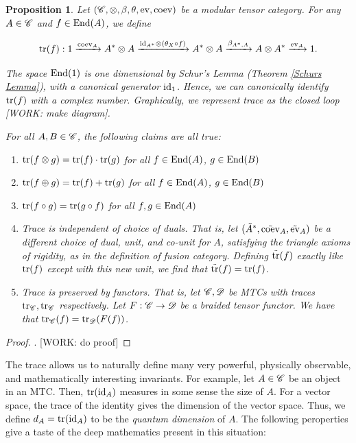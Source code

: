 \documentclass{article}
\newtheorem{proposition}{Proposition}[section]
\theoremstyle{definition}
\numberwithin{figure}{section}
\begin{document}
\begin{proposition}\label{trace} Let $(\mathscr{C},\otimes, \beta, \theta, \mathrm{ev},\mathrm{coev})$ be a modular tensor category. For any $A\in \mathscr{C}$ and $f\in \mathrm{End}(A)$, we define

$$\mathrm{tr}(f): 1\xrightarrow{\mathrm{coev}_A} A^*\otimes A\xrightarrow{\mathrm{id}_{A^*}\otimes (\theta_X\circ f)} A^*\otimes A \xrightarrow{\beta_{A^*,A}}A\otimes A^*\xrightarrow{\mathrm{ev}_A}1.$$

The space $\mathrm{End}(1)$ is one dimensional by Schur's Lemma (Theorem \ref{Schurs Lemma}), with a canonical generator $\mathrm{id}_1$. Hence, we can canonically identify $\mathrm{tr}(f)$ with a complex number. Graphically, we represent trace as the closed loop [WORK: make diagram].

For all $A,B\in \mathscr{C}$, the following claims are all true:

\begin{enumerate}
\item $\mathrm{tr}(f\otimes g)=\mathrm{tr}(f)\cdot \mathrm{tr}(g)$ for all $f\in \mathrm{End}(A)$, $g\in \mathrm{End}(B)$
\item $\mathrm{tr}(f\oplus g)=\mathrm{tr}(f)+\mathrm{tr}(g)$ for all $f\in \mathrm{End}(A)$, $g\in \mathrm{End}(B)$
\item $\mathrm{tr}(f\circ g)=\mathrm{tr}(g\circ f)$ for all $f,g\in \mathrm{End}(A)$
\item Trace is independent of choice of duals. That is, let $(\tilde{A}^*,\tilde{\mathrm{coev}}_{A}, \tilde{\mathrm{ev}}_A)$ be a different choice of dual, unit, and co-unit for $A$, satisfying the triangle axioms of rigidity, as in the definition of fusion category. Defining $\tilde{\mathrm{tr}}(f)$ exactly like $\mathrm{tr}(f)$ except with this new unit, we find that $\tilde{\mathrm{tr}}(f)=\mathrm{tr}(f)$.
\item Trace is preserved by functors. That is, let $\mathscr{C},\mathscr{D}$ be MTCs with traces $\mathrm{tr}_{\mathscr{C}},\mathrm{tr}_{\mathscr{C}}$ respectively. Let $F:\mathscr{C}\to \mathscr{D}$ be a braided tensor functor. We have that $\mathrm{tr}_{\mathscr{C}}(f)=\mathrm{tr}_{\mathscr{D}}(F(f))$.
\end{enumerate}
\end{proposition}
\begin{proof}. [WORK: do proof]
\end{proof}

The trace allows us to naturally define many very powerful, physically observable, and mathematically interesting invariants. For example, let $A\in \mathscr{C}$ be an object in an MTC. Then, $\mathrm{tr}(\mathrm{id}_A)$ measures in some sense the size of $A$. For a vector space, the trace of the identity gives the dimension of the vector space. Thus, we define $d_A=\mathrm{tr}(\mathrm{id}_A)$ to be the \textit{quantum dimension} of $A$. The following peroperties give a taste of the deep mathematics present in this situation:
\end{document}
